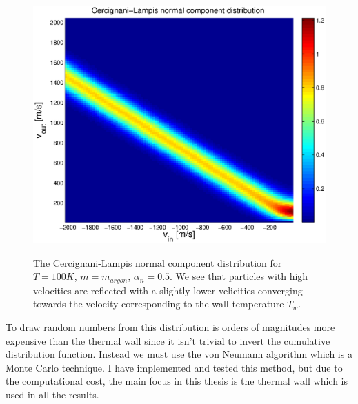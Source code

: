 \begin{figure}[h]
\begin{center}
\includegraphics[width=\textwidth, trim=0cm 0cm 0cm 0cm, clip]{DSMC/figures/cercignani-lampis.eps}
\label{fig:cercignani_lampis}
\end{center}
\caption{The Cercignani-Lampis normal component distribution for $T=100K$, $m=m_{argon}$, $\alpha_n=0.5$. We see that particles with high velocities are reflected with a slightly lower velicities converging towards the velocity corresponding to the wall temperature $T_w$.}
\end{figure}

To draw random numbers from this distribution is orders of magnitudes more expensive than the thermal wall since it isn't trivial to invert the cumulative distribution function. Instead we must use the von Neumann algorithm which is a Monte Carlo technique\cite{allen1989computer}. I have implemented and tested this method, but due to the computational cost, the main focus in this thesis is the thermal wall which is used in all the results. 